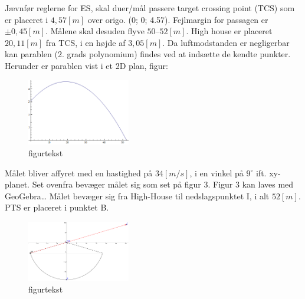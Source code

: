 Jævnfør reglerne for ES, skal duer/mål passere target crossing point (TCS) som er 
placeret i $4,57 [m]$ over origo. (0; 0; 4.57). Fejlmargin for passagen er $\pm0,45 [m]$. 
Målene skal desuden flyve $50 – 52 [m]$.  High house er placeret $20,11 [m]$ fra TCS, i en 
højde af $3,05 [m]$. Da luftmodstanden er negligerbar kan parablen (2. grads 
polynomium) findes ved at indsætte de kendte punkter. Herunder er parablen vist i et 
2D plan, figur:
\begin{figure}[th!]
\centering
\includegraphics[width=0.4\textwidth]{./graphics/high_house_2D_parabola}
\caption[tekst i indholdsfortegnelsen]{figurtekst}
\label{fig:}
\end{figure}

Målet bliver affyret med en hastighed på $34 [m/s]$, i en vinkel på $9^{\circ}$ ift. xy-
planet. Set ovenfra bevæger målet sig som set på figur 3. Figur 3 kan laves med 
GeoGebra…  Målet bevæger sig fra High-House til nedslagspunktet I, i alt $52 [m]$. 
PTS er placeret i punktet B. 


\begin{figure}[th!]
\centering
\includegraphics[width=0.4\textwidth]{./graphics/parabola_in_xy_plane}
\caption[tekst i indholdsfortegnelsen]{figurtekst}
\label{fig:}
\end{figure}